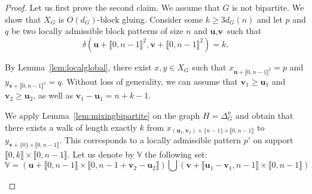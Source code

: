 \documentclass{article}
\begin{document}
\begin{proof}
Let us first prove the second claim. We assume that $G$ is not bipartite. We show that $X_G$ is $O(d_G)$-block gluing. Consider some $k\geq 3d_G(n)$ and let $p$ and $q$ be two locally admissible block patterns of size $n$ and $\textbf{u},\textbf{v}$ such that 
\[\delta\left(\textbf{u}+\llbracket 0, n-1\rrbracket ^2,\textbf{v}+\llbracket 0, n-1\rrbracket ^2\right) = k.\]

By Lemma~\ref{lem:localglobal}, there exist $x, y \in X_G$ such that $x_{\textbf{u}+\llbracket 0, n-1\rrbracket^2} = p$ and  $y_{\textbf{v}+\llbracket 0, n-1\rrbracket^2} = q$. Without loss of generality, we can assume that $\textbf{v}_1 \ge \textbf{u}_1$ and $\textbf{v}_2 \ge \textbf{u}_2$, as well as $\textbf{v}_1 - \textbf{u}_1 = n + k-1$.

We apply Lemma~\ref{lem:mixingbipartite} on the graph $H=\Delta_G^n$ and obtain that there exists a walk of length exactly $k$ from $x_{(\textbf{u}_1,\textbf{v}_2)+\{n-1\}\times \llbracket 0,n-1 \rrbracket}$ to $y_{\textbf{v} + \{0\}\times \llbracket 0,n-1 \rrbracket}$. This corresponds to a locally admissible pattern $p'$ on support $\llbracket 0,k \rrbracket \times \llbracket 0,n-1 \rrbracket$.
Let us denote by $\mathbb{V}$ the following set: 
\[
\mathbb{V} = \left (\mathbf{u}+\llbracket 0, n-1\rrbracket \times \llbracket 0, n-1+ \textbf{v}_2 - \textbf{u}_2 \rrbracket
\right) \bigcup \left (\mathbf{v}+\llbracket \textbf{u}_1 - \textbf{v}_1, n-1\rrbracket \times \llbracket 0, n-1 \rrbracket
\right)\]

\begin{figure}[h!]
\begin{center}
\end{center}
\end{figure}
\end{proof}
\end{document}
